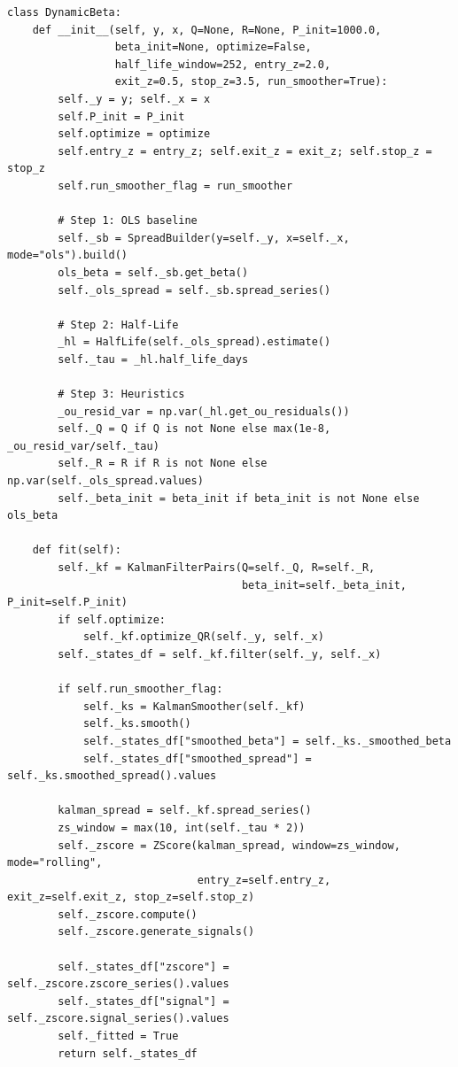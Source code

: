 \documentclass[10pt,a4paper,twocolumn]{article}
\begin{document}
\begin{tcolorbox}[codebox={\texttt{dynamic\_beta.py} Main Architecture}]
\begin{lstlisting}[style=pythonplain]
class DynamicBeta:
    def __init__(self, y, x, Q=None, R=None, P_init=1000.0,
                 beta_init=None, optimize=False,
                 half_life_window=252, entry_z=2.0,
                 exit_z=0.5, stop_z=3.5, run_smoother=True):
        self._y = y; self._x = x
        self.P_init = P_init
        self.optimize = optimize
        self.entry_z = entry_z; self.exit_z = exit_z; self.stop_z = stop_z
        self.run_smoother_flag = run_smoother
        
        # Step 1: OLS baseline
        self._sb = SpreadBuilder(y=self._y, x=self._x, mode="ols").build()
        ols_beta = self._sb.get_beta()
        self._ols_spread = self._sb.spread_series()
        
        # Step 2: Half-Life
        _hl = HalfLife(self._ols_spread).estimate()
        self._tau = _hl.half_life_days
        
        # Step 3: Heuristics
        _ou_resid_var = np.var(_hl.get_ou_residuals())
        self._Q = Q if Q is not None else max(1e-8, _ou_resid_var/self._tau)
        self._R = R if R is not None else np.var(self._ols_spread.values)
        self._beta_init = beta_init if beta_init is not None else ols_beta

    def fit(self):
        self._kf = KalmanFilterPairs(Q=self._Q, R=self._R,
                                     beta_init=self._beta_init, P_init=self.P_init)
        if self.optimize:
            self._kf.optimize_QR(self._y, self._x)
        self._states_df = self._kf.filter(self._y, self._x)
        
        if self.run_smoother_flag:
            self._ks = KalmanSmoother(self._kf)
            self._ks.smooth()
            self._states_df["smoothed_beta"] = self._ks._smoothed_beta
            self._states_df["smoothed_spread"] = self._ks.smoothed_spread().values
            
        kalman_spread = self._kf.spread_series()
        zs_window = max(10, int(self._tau * 2))
        self._zscore = ZScore(kalman_spread, window=zs_window, mode="rolling",
                              entry_z=self.entry_z, exit_z=self.exit_z, stop_z=self.stop_z)
        self._zscore.compute()
        self._zscore.generate_signals()
        
        self._states_df["zscore"] = self._zscore.zscore_series().values
        self._states_df["signal"] = self._zscore.signal_series().values
        self._fitted = True
        return self._states_df
\end{lstlisting}
\end{tcolorbox}
\end{document}
